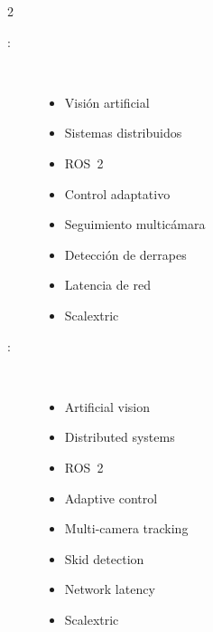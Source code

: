 \begin{multicols}{2}
\begin{description}
\item [\palabraschaveprincipal:] \mbox{} \\[-20pt]
  \begin{itemize}
    \item Visión artificial
    \item Sistemas distribuidos
    \item ROS~2
    \item Control adaptativo
    \item Seguimiento multicámara
    \item Detección de derrapes
    \item Latencia de red
    \item Scalextric
  \end{itemize}
\end{description}
\begin{description}
\item [\palabraschavesecundaria:] \mbox{} \\[-20pt]
  \begin{itemize}
    \item Artificial vision
    \item Distributed systems
    \item ROS~2
    \item Adaptive control
    \item Multi-camera tracking
    \item Skid detection
    \item Network latency
    \item Scalextric
  \end{itemize}
\end{description}
\end{multicols}
